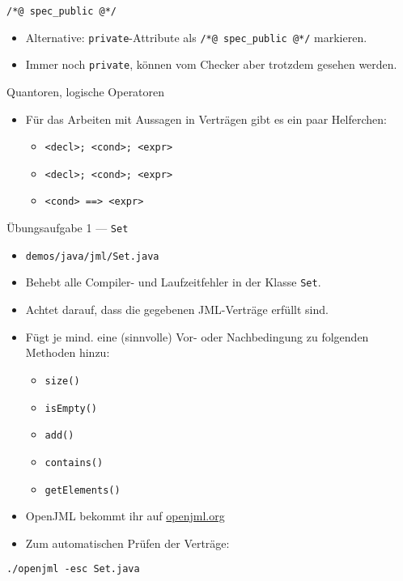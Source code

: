 \documentclass{beamer}
\begin{document}
\begin{frame}{\texttt{/*@ spec\_public @*/}}

	\begin{itemize}
		\item Alternative: \texttt{private}-Attribute als \texttt{/*@ spec\_public @*/} markieren.
		\item Immer noch \texttt{private}, können vom Checker aber trotzdem gesehen werden.
	\end{itemize}
\end{frame}

\begin{frame}{Quantoren, logische Operatoren}

	\begin{itemize}
		\item Für das Arbeiten mit Aussagen in Verträgen gibt es ein paar Helferchen:
		\begin{itemize}
			\item \texttt{\string\forall <decl>; <cond>; <expr>}
			\item \texttt{\string\exists <decl>; <cond>; <expr>}
			\item \texttt{<cond> ==> <expr>}
		\end{itemize}
	\end{itemize}
\end{frame}

\begin{frame}{Übungsaufgabe 1 --- \texttt{Set}}
	\begin{itemize}
		\item \texttt{demos/java/jml/Set.java}
		\item Behebt alle Compiler- und Laufzeitfehler in der Klasse \texttt{Set}.
		\pause
		\item Achtet darauf, dass die gegebenen JML-Verträge erfüllt sind.
		\pause
		\item Fügt je mind. eine (sinnvolle) Vor- oder Nachbedingung zu folgenden Methoden hinzu:
		\begin{itemize}
			\item \texttt{size()}
			\item \texttt{isEmpty()}
			\item \texttt{add()}
			\item \texttt{contains()}
			\item \texttt{getElements()}
		\end{itemize}
	\end{itemize}

        \vfill

        \begin{itemize}
          \item OpenJML bekommt ihr auf \href{https://openjml.org}{openjml.org}
          \item Zum automatischen Prüfen der Verträge:
        \end{itemize}
        \footnotesize
        \texttt{./openjml -esc Set.java}
\end{frame}
\end{document}
